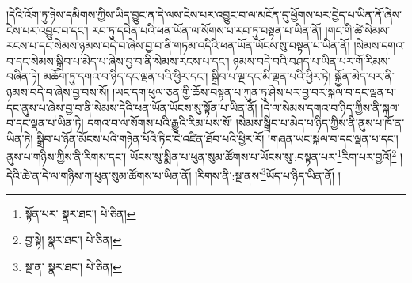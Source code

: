 །དེའི་འོག་ཏུ་ཉེས་དམིགས་ཀྱིས་ཡིད་བྱུང་ན་དེ་ལས་ངེས་པར་འབྱུང་བ་ལ་མངོན་དུ་ཕྱོགས་པར་བྱེད་པ་ཡིན་ནོ་ཞེས་ངེས་པར་འབྱུང་བ་དང་། རབ་ཏུ་དབེན་པའི་ཕན་ཡོན་ལ་སོགས་པ་རབ་ཏུ་བསྟན་པ་ཡིན་ནོ། །གང་གི་ཚེ་སེམས་རངས་པ་དང་སེམས་ཉམས་བདེ་བ་ཞེས་བྱ་བ་ནི་གཏམ་འདིའི་ཕན་ཡོན་ཡོངས་སུ་བསྟན་པ་ཡིན་ནོ། །སེམས་དགའ་བ་དང་སེམས་སྒྲིབ་པ་མེད་པ་ཞེས་བྱ་བ་ནི་སེམས་རངས་པ་དང་། ཉམས་བདེ་བའི་བཤད་པ་ཡིན་པར་གོ་རིམས་བཞིན་ཏེ། མཆོག་ཏུ་དགའ་བ་ཉིད་དང་ལྡན་པའི་ཕྱིར་དང་། སྒྲིབ་པ་ལྔ་དང་མི་ལྡན་པའི་ཕྱིར་ཏེ། སྐྱོན་མེད་པར་ནི་ཉམས་བདེ་བ་ཞེས་བྱ་བས་སོ། །ཡང་དག་ཕུལ་ཅན་གྱི་ཆོས་བསྟན་པ་ཀུན་ཏུ་ཤེས་པར་བྱ་བར་སྐལ་བ་དང་ལྡན་པ་དང་ནུས་པ་ཞེས་བྱ་བ་ནི་སེམས་དེའི་ཕན་ཡོན་ཡོངས་སུ་སྟོན་པ་ཡིན་ནོ། །དེ་ལ་སེམས་དགའ་བ་ཉིད་ཀྱིས་ནི་སྐལ་བ་དང་ལྡན་པ་ཡིན་ཏེ། དགའ་བ་ལ་སོགས་པའི་རྒྱུའི་རིམ་པས་སོ། །སེམས་སྒྲིབ་པ་མེད་པ་ཉིད་ཀྱིས་ནི་ནུས་པ་ཁོ་ན་ཡིན་ཏེ། སྒྲིབ་པ་ཉོན་མོངས་པའི་གཉེན་པོའི་ཏིང་ངེ་འཛིན་ཐོབ་པའི་ཕྱིར་རོ། །གཞན་ཡང་སྐལ་བ་དང་ལྡན་པ་དང་། ནུས་པ་གཉིས་ཀྱིས་ནི་རིགས་དང་། ཡོངས་སུ་སྨིན་པ་ཕུན་སུམ་ཚོགས་པ་ཡོངས་སུ་:བསྟན་པར་\footnote{སྟོན་པར་  སྣར་ཐང་།  པེ་ཅིན། }རིག་པར་བྱའོ།\footnote{བྱ་སྟེ།  སྣར་ཐང་།  པེ་ཅིན། } །དེའི་ཚེ་ན་དེ་ལ་གཉིས་ཀ་ཕུན་སུམ་ཚོགས་པ་ཡིན་ནོ། །རིགས་ནི་:སྔ་ནས་\footnote{སྔ་ན་  སྣར་ཐང་།  པེ་ཅིན། }ཡོད་པ་ཉིད་ཡིན་ནོ། །
